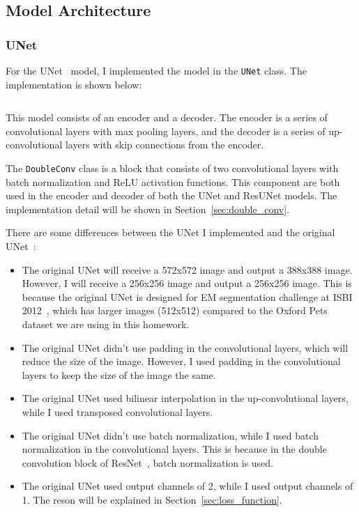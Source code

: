 \subsection{Model Architecture}

\subsubsection{UNet}
\label{sec:unet}

For the UNet~\cite{UNet} model, I implemented the model in the \texttt{UNet} class. The implementation is shown below:

\inputminted[firstline=7]{python}{../src/models/unet.py}

This model consists of an encoder and a decoder. The encoder is a series of convolutional layers with max pooling layers, and the decoder is a series of up-convolutional layers with skip connections from the encoder.

The \texttt{DoubleConv} class is a block that consists of two convolutional layers with batch normalization and ReLU activation functions.
This component are both used in the encoder and decoder of both the UNet and ResUNet models.
The implementation detail will be shown in Section~\ref{sec:double_conv}.

There are some differences between the UNet I implemented and the original UNet~\cite{UNet}:
\begin{itemize}
    \item The original UNet will receive a 572x572 image and output a 388x388 image. However, I will receive a 256x256 image and output a 256x256 image.
          This is because the original UNet is designed for EM segmentation challenge at ISBI 2012~\cite{ISBI2012EM}, which has larger images (512x512) compared to the Oxford Pets dataset we are using in this homework.
    \item The original UNet didn't use padding in the convolutional layers, which will reduce the size of the image.
          However, I used padding in the convolutional layers to keep the size of the image the same.
    \item The original UNet used bilinear interpolation in the up-convolutional layers, while I used transposed convolutional layers.
    \item The original UNet didn't use batch normalization, while I used batch normalization in the convolutional layers.
          This is because in the double convolution block of ResNet~\cite{ResNet}, batch normalization is used.
    \item The original UNet used output channels of 2, while I used output channels of 1. The reson will be explained in Section~\ref{sec:loss_function}.
\end{itemize}

